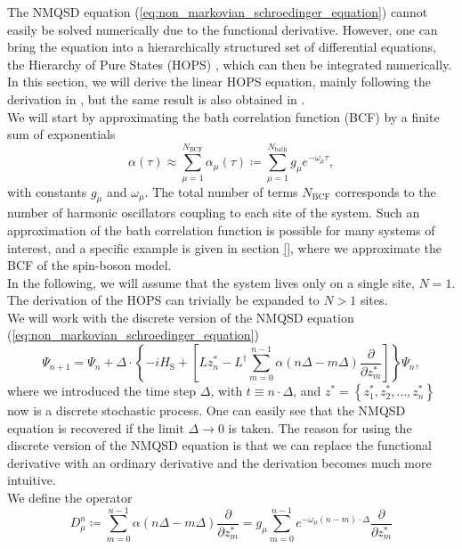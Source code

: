 The NMQSD equation (\ref{eq:non_markovian_schroedinger_equation})
cannot easily be solved numerically due to the functional derivative.
However, one can bring the equation into a hierarchically structured
set of differential equations, the Hierarchy of Pure States (HOPS) \cite{Suess:2014},
which can then be integrated numerically. In this section, we will derive the linear HOPS equation, mainly
following the derivation in \cite{Hartmann:2021}, but the same result is also obtained in \cite{Suess:2014,Hartmann:2017}.
\\
We will start by approximating the bath correlation function (BCF) by a finite sum of exponentials
\begin{equation*}
    \alpha\left(\tau\right) \approx \sum_{\mu=1}^{N_\text{BCF}} \alpha_\mu\left(\tau\right) \coloneqq \sum_{\mu=1}^{N_\text{bath}} g_\mu e^{-\omega_\mu\tau},
\end{equation*}
with constants $g_\mu$ and $\omega_\mu$. The total number of terms $N_\text{BCF}$ corresponds
to the number of harmonic oscillators coupling to each site of the system. Such an approximation
of the bath correlation function is possible for many systems of interest, and a specific
example is given in section \ref{}, where we approximate the BCF of the spin-boson model.
\\
In the following, we will assume that the system lives only on a single site, $N=1$. The derivation of the HOPS can
trivially be expanded to $N>1$ sites.
\\
We will work with the discrete version of the NMQSD equation (\ref{eq:non_markovian_schroedinger_equation}) \cite{Hartmann:2021}
\begin{equation}
    \label{eq:discrete_NMQSD_equation}
    \Psi_{n+1} = \Psi_n + \Delta \cdot \left\{
        -iH_\text{S}+\left[
            Lz_{n}^* - L^\dagger \sum_{m=0}^{n-1} \alpha\left(n\Delta-m\Delta\right)\frac{\partial}{\partial z_{m}^*}
        \right]
    \right\} \Psi_n,
\end{equation}
where we introduced the time step $\Delta$, with $t \equiv n\cdot\Delta$, and $z^* = \left\{z_{1}^*, z_{2}^*,\dots,z_{n}^*\right\}$
now is a discrete stochastic process. One can easily see that the NMQSD equation
is recovered if the limit $\Delta\rightarrow0$ is taken. The reason for using the discrete version of the NMQSD equation
is that we can replace the functional derivative with an ordinary derivative
and the derivation becomes much more intuitive.
\\
We define the operator
\begin{equation*}
    D_\mu^n \coloneqq \sum_{m=0}^{n-1} \alpha\left(n\Delta - m\Delta\right) \frac{\partial}{\partial z_m^*}
    = g_\mu \sum_{m=0}^{n-1} e^{-\omega_\mu\left(n-m\right)\cdot\Delta}
    \frac{\partial}{\partial z_m^*}
\end{equation*}
